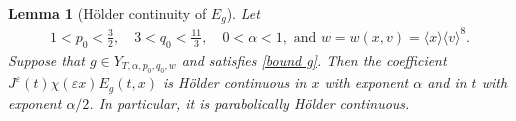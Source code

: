 \documentclass[reqno,11pt,final]{amsart}
\theoremstyle{plain}
\newtheorem{lemma}[theorem]{Lemma}
\numberwithin{equation}{section}
\numberwithin{theorem}{section}
\begin{document}
\begin{lemma}[H\"older continuity of $E_g$]\label{Holder cont of E_g} Let
\begin{equation}\label{Y comp condi}
    \begin{gathered}
        1<p_0<\frac{3}{2}, \quad 3<q_0<\frac{11}{3}, \quad0<\alpha<1,\text{ and }
        w =w(x,v)=\langle x\rangle\langle v\rangle^8.
    \end{gathered}
\end{equation}Suppose that $g\in Y_{T,\alpha,p_0,q_0,w}$ and satisfies \eqref{bound g}. Then the coefficient $J^\varepsilon(t)\chi(\varepsilon x) E_g(t,x)$ is H\"older continuous in $x$ with exponent $\alpha$ and in $t$ with exponent $\alpha/2$. %
In particular, it is parabolically H\"older continuous.
\end{lemma}
\end{document}
